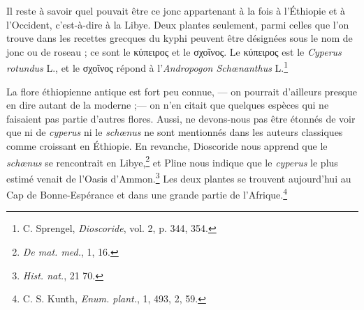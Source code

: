 \documentclass[a4paper, 11pt, oneside]{article}
\begin{document}

Il reste à savoir quel pouvait être ce jonc appartenant à la fois à l'Éthiopie et à l'Occident, c'est-à-dire à la Libye. Deux plantes seulement, parmi celles que l'on trouve dans les recettes grecques du kyphi peuvent être désignées sous le nom de jonc ou de roseau ; ce sont le κύπειρος et le σχοῖνος. Le κύπειρος est le \emph{Cyperus rotundus} L., et le σχοῖνος répond à l'\emph{Andropogon Schœnanthus} L.\footnote{C. Sprengel, \emph{Dioscoride}, vol. 2, p. 344, 354.}

La flore éthiopienne antique est fort peu connue, --- on pourrait d'ailleurs presque en dire autant de la moderne ;--- on n'en citait que quelques espèces qui ne faisaient pas partie d'autres flores. Aussi, ne devons-nous pas être étonnés de voir que ni de \emph{cyperus} ni le \emph{schœnus} ne sont mentionnés dans les auteurs classiques comme croissant en Éthiopie. En revanche, Dioscoride nous apprend que le \emph{schœnus} se rencontrait en Libye,\footnote{\emph{De mat. med.}, 1, 16.} et Pline nous indique que le \emph{cyperus} le plus estimé venait de l'Oasis d'Ammon.\footnote{\emph{Hist. nat.}, 21 70.} Les deux plantes se trouvent aujourd'hui au Cap de Bonne-Espérance et dans une grande partie de l'Afrique.\footnote{C. S. Kunth, \emph{Enum. plant.}, 1, 493, 2, 59.}
\end{document}
